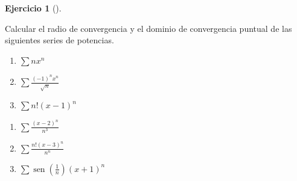 \documentclass[
  spanish,
  a4paper,
]{scrreport}
\theoremstyle{definition}
\newtheorem{exercise}{Ejercicio}[chapter]
\theoremstyle{remark}
\begin{document}
\begin{exercise}[]\protect\hypertarget{exr-radio-convergencia}{}\label{exr-radio-convergencia}

Calcular el radio de convergencia y el dominio de convergencia puntual
de las siguientes series de potencias.

\begin{enumerate}
\def\labelenumi{\alph{enumi}.}
\item
  \(\sum nx^n\)
\item
  \(\sum \frac{(-1)^nx^n}{\sqrt{n}}\)
\item
  \(\sum n!(x-1)^n\)
\end{enumerate}

\begin{enumerate}
\def\labelenumi{\alph{enumi}.}
\setcounter{enumi}{3}
\item
  \(\sum \frac{(x-2)^n}{n^3}\)
\item
  \(\sum \frac{n!(x-3)^n}{n^n}\)
\item
  \(\sum \operatorname{sen}\left(\frac{1}{n}\right) (x+1)^n\)
\end{enumerate}

\end{exercise}
\end{document}
